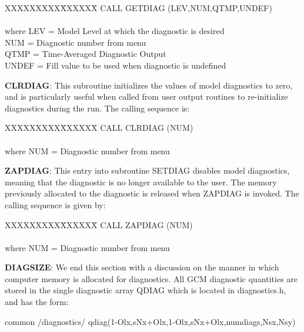 \begin{tabbing}
XXXXXXXXX\=XXXXXX\= \kill
\>        CALL GETDIAG (LEV,NUM,QTMP,UNDEF) \\
\\
where \>  LEV   \>= Model Level at which the diagnostic is desired \\
      \>  NUM   \>= Diagnostic number from menu \\
      \>  QTMP  \>= Time-Averaged Diagnostic Output \\
      \>  UNDEF \>= Fill value to be used when diagnostic is undefined \\
\end{tabbing}

{\bf CLRDIAG}:  This subroutine initializes the values of model diagnostics to zero, and is
particularly useful when called from user output routines to re-initialize diagnostics during the
run.  The calling sequence is:


\begin{tabbing}
XXXXXXXXX\=XXXXXX\= \kill
\>        CALL CLRDIAG (NUM) \\
\\
where \>  NUM   \>= Diagnostic number from menu \\
\end{tabbing}



{\bf ZAPDIAG}:  This entry into subroutine SETDIAG disables model diagnostics, meaning that the
diagnostic is no longer available to the user.  The memory previously allocated to the diagnostic
is released when ZAPDIAG is invoked.  The calling sequence is given by:


\begin{tabbing}
XXXXXXXXX\=XXXXXX\= \kill
\>        CALL ZAPDIAG (NUM) \\
\\
where \>  NUM   \>= Diagnostic number from menu \\
\end{tabbing}

{\bf DIAGSIZE}:  We end this section with a discussion on the manner in which computer memory   
is allocated for diagnostics.   
All GCM diagnostic quantities are stored in the single
diagnostic array QDIAG which is located in diagnostics.h, and has the form:

common /diagnostics/ qdiag(1-Olx,sNx+Olx,1-Olx,sNx+Olx,numdiags,Nsx,Nsy)

